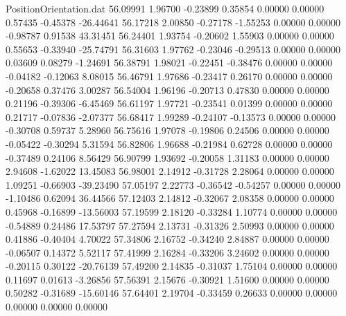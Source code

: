 \begin{filecontents}{PositionOrientation.dat}
  56.09991    1.96700   -0.23899     0.35854    0.00000    0.00000    0.57435   -0.45378  -26.44641
  56.17218    2.00850   -0.27178    -1.55253    0.00000    0.00000   -0.98787    0.91538   43.31451
  56.24401    1.93754   -0.20602     1.55903    0.00000    0.00000    0.55653   -0.33940  -25.74791
  56.31603    1.97762   -0.23046    -0.29513    0.00000    0.00000    0.03609    0.08279   -1.24691
  56.38791    1.98021   -0.22451    -0.38476    0.00000    0.00000   -0.04182   -0.12063    8.08015
  56.46791    1.97686   -0.23417     0.26170    0.00000    0.00000   -0.20658    0.37476    3.00287
  56.54004    1.96196   -0.20713     0.47830    0.00000    0.00000    0.21196   -0.39306   -6.45469
  56.61197    1.97721   -0.23541     0.01399    0.00000    0.00000    0.21717   -0.07836   -2.07377
  56.68417    1.99289   -0.24107    -0.13573    0.00000    0.00000   -0.30708    0.59737    5.28960
  56.75616    1.97078   -0.19806     0.24506    0.00000    0.00000   -0.05422   -0.30294    5.31594
  56.82806    1.96688   -0.21984     0.62728    0.00000    0.00000   -0.37489    0.24106    8.56429
  56.90799    1.93692   -0.20058     1.31183    0.00000    0.00000    2.94608   -1.62022   13.45083
  56.98001    2.14912   -0.31728     2.28064    0.00000    0.00000    1.09251   -0.66903  -39.23490
  57.05197    2.22773   -0.36542    -0.54257    0.00000    0.00000   -1.10486    0.62094   36.44566
  57.12403    2.14812   -0.32067     2.08358    0.00000    0.00000    0.45968   -0.16899  -13.56003
  57.19599    2.18120   -0.33284     1.10774    0.00000    0.00000   -0.54889    0.24486   17.53797
  57.27594    2.13731   -0.31326     2.50993    0.00000    0.00000    0.41886   -0.40404    4.70022
  57.34806    2.16752   -0.34240     2.84887    0.00000    0.00000   -0.06507    0.14372    5.52117
  57.41999    2.16284   -0.33206     3.24602    0.00000    0.00000   -0.20115    0.30122  -20.76139
  57.49200    2.14835   -0.31037     1.75104    0.00000    0.00000    0.11697    0.01613   -3.26856
  57.56391    2.15676   -0.30921     1.51600    0.00000    0.00000    0.50282   -0.31689  -15.60146
  57.64401    2.19704   -0.33459     0.26633    0.00000    0.00000    0.00000    0.00000    0.00000
\end{filecontents}

